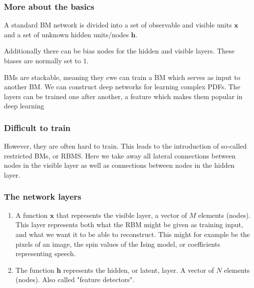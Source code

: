\documentclass{beamer}
\begin{document}
\begin{frame}
\frametitle{More about the basics}

\begin{block}{}
A standard BM network is divided into a set of observable and visible units $\bm{x}$ and a set of unknown hidden units/nodes $\bm{h}$.
\end{block}

\begin{block}{}
Additionally there can be bias nodes for the hidden and visible layers. These biases are normally set to $1$.
\end{block}

\begin{block}{}
BMs are stackable, meaning they cwe can train a BM which serves as input to another BM. We can construct deep networks for learning complex PDFs. The layers can be trained one after another, a feature which makes them popular in deep learning
\end{block}
\end{frame}

\begin{frame}
\frametitle{Difficult to train}

However, they are often hard to train. This leads to the introduction
of so-called restricted BMs, or RBMS.  Here we take away all lateral
connections between nodes in the visible layer as well as connections
between nodes in the hidden layer.
\end{frame}

\begin{frame}
\frametitle{The network layers}

\begin{enumerate}
\item A function $\bm{x}$ that represents the visible layer, a vector of $M$ elements (nodes). This layer represents both what the RBM might be given as training input, and what we want it to be able to reconstruct. This might for example be the pixels of an image, the spin values of the Ising model, or coefficients representing speech.

\item The function $\bm{h}$ represents the hidden, or latent, layer. A vector of $N$ elements (nodes). Also called "feature detectors".
\end{enumerate}

\noindent
\end{frame}
\end{document}
